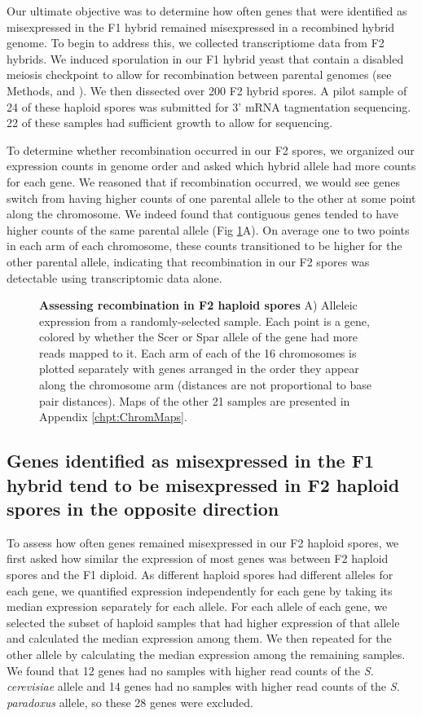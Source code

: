 Our ultimate objective was to determine how often genes that were identified as misexpressed in the F1 hybrid remained misexpressed in a recombined hybrid genome. To begin to address this, we collected transcriptiome data from F2 hybrids. We induced sporulation in our F1 hybrid yeast that contain a disabled meiosis checkpoint to allow for recombination between parental genomes (see Methods, and \cite{Bozdag2021}). We then dissected over 200 F2 hybrid spores. A pilot sample of 24 of these haploid spores was submitted for 3' mRNA tagmentation sequencing. 22 of these samples had sufficient growth to allow for sequencing. 

To determine whether recombination occurred in our F2 spores, we organized our expression counts in genome order and asked which hybrid allele had more counts for each gene. We reasoned that if recombination occurred, we would see genes switch from having higher counts of one parental allele to the other at some point along the chromosome. We indeed found that contiguous genes tended to have higher counts of the same parental allele (Fig \ref{fig:map}A). On average one to two points in each arm of each chromosome, these counts transitioned to be higher for the other parental allele, indicating that recombination in our F2 spores was  detectable using transcriptomic data alone.

\begin{figure}
    \centering
    \caption{\textbf{Assessing recombination in F2 haploid spores} A) Alleleic expression from a randomly-selected sample. Each point is a gene, colored by whether the Scer or Spar allele of the gene had more reads mapped to it. Each arm of each of the 16 chromosomes is plotted separately with genes arranged in the order they appear along the chromosome arm (distances are not proportional to base pair distances). Maps of the other 21 samples are presented in Appendix \ref{chpt:ChromMaps}.}
    \label{fig:map}
\end{figure}

\subsection{Genes identified as misexpressed in the F1 hybrid tend to be misexpressed in F2 haploid spores in the opposite direction}

To assess how often genes remained misexpressed in our F2 haploid spores, we first asked how similar the expression of most genes was between F2 haploid spores and the F1 diploid. As different haploid spores had different alleles for each gene, we quantified expression independently for each gene by taking its median expression separately for each allele. For each allele of each gene, we selected the subset of haploid samples that had higher expression of that allele and calculated the median expression among them. We then repeated for the other allele by calculating the median expression among the remaining samples. We found that 12 genes had no samples with higher read counts of the \textit{S. cerevisiae} allele and 14 genes had no samples with higher read counts of the \textit{S. paradoxus} allele, so these 28 genes were excluded.

